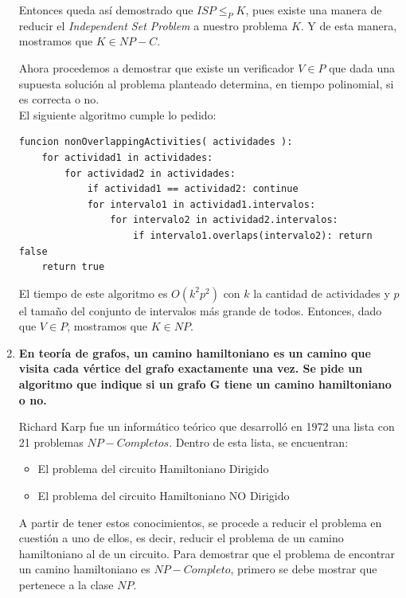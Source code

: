 \documentclass{article}
\newcommand\tab[1][0.5cm]{\hspace*{#1}}
\begin{document}
\begin{enumerate}
            \tab Entonces queda así demostrado que $ISP \leq_{P} K$, pues existe una manera de reducir el
            \emph{Independent Set Problem} a nuestro problema $K$. Y de esta manera, mostramos que $K \in NP-C$.

            \tab Ahora procedemos a demostrar que existe un verificador $V \in P$ que dada una supuesta solución
            al problema planteado determina, en tiempo polinomial, si es correcta o no.\\
            \tab El siguiente algoritmo cumple lo pedido:

            \begin{lstlisting}
funcion nonOverlappingActivities( actividades ):
    for actividad1 in actividades:
        for actividad2 in actividades:
            if actividad1 == actividad2: continue
            for intervalo1 in actividad1.intervalos:
                for intervalo2 in actividad2.intervalos:
                    if intervalo1.overlaps(intervalo2): return false
    return true
            \end{lstlisting}

            \tab El tiempo de este algoritmo es $O(k^2p^2)$ con $k$ la cantidad de actividades y $p$ el tamaño
            del conjunto de intervalos más grande de todos. Entonces, dado que $V \in P$, mostramos que
            $K \in NP$.

        \item \textbf{En teoría de grafos, un camino hamiltoniano es un camino que visita cada vértice del grafo exactamente
            una vez. Se pide un algoritmo que indique si un grafo G tiene un camino hamiltoniano o no.} %

            \tab Richard Karp fue un informático teórico que desarrolló en 1972 una lista con 21 problemas $NP-Completos$.
            Dentro de esta lista, se encuentran:
            \begin{itemize}
              \item El problema del circuito Hamiltoniano Dirigido
              \item El problema del circuito Hamiltoniano NO Dirigido
            \end{itemize}

            \tab A partir de tener estos conocimientos, se procede a reducir el problema en cuestión a uno de ellos, es decir,
             reducir el problema de un camino hamiltoniano al de un circuito. Para demostrar que el problema de encontrar un
             camino hamiltoniano es $NP-Completo$, primero se debe mostrar que pertenece a la clase $NP$.


\end{enumerate}
\end{document}
